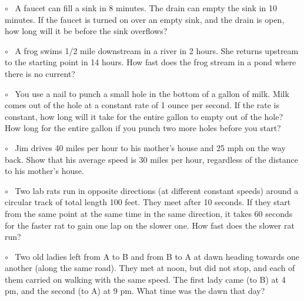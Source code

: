 \documentclass[11pt, oneside]{article}
\begin{document}
$\circ$ \ A faucet can fill a sink in 8 minutes.  The drain can empty the sink in 10 minutes.  If the faucet is turned on over an empty sink, and the drain is open, how long will it be before the sink overflows?

$\circ$ \ A frog swims 1/2 mile downstream in a river in 2 hours.  She returns upstream to the starting point in 14 hours.  How fast does the frog stream in a pond where there is no current?

$\circ$ \ You use a nail to punch a small hole in the bottom of a gallon of milk.  Milk comes out of the hole at a constant rate of 1 ounce per second.  If the rate is constant, how long will it take for the entire gallon to empty out of the hole?  How long for the entire gallon if you punch two more holes before you start?

$\circ$ \ Jim drives 40 miles per hour to his mother's house and 25 mph on the way back.  Show that his average speed is 30 miles per hour, regardless of the distance to his mother's house.

$\circ$ \ Two lab rats run in opposite directions (at different constant speeds) around a circular track of total length 100 feet.  They meet after 10 seconds.  If they start from the same point at the same time in the same direction, it takes 60 seconds for the faster rat to gain one lap on the slower one.  How fast does the slower rat run?

$\circ$ \ Two old ladies left from A to B and from B to A at dawn heading towards one another (along the same road). They met at noon, but did not stop, and each of them carried on walking with the same speed. The first lady came (to B) at 4 pm, and the second (to A) at 9 pm. What time was the dawn that day?
\end{document}
